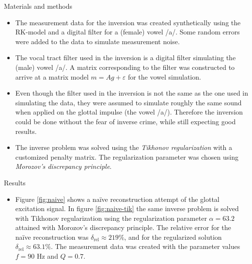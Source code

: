\documentclass[final]{beamer}
\newcommand{\eps}{\ensuremath{\varepsilon}}
\begin{document}
\begin{frame}[t]
\begin{columns}[t]
\begin{column}{.465\textwidth}
\begin{block}{Materials and methods}
\begin{itemize}
\item The measurement data for the inversion was created synthetically using the RK-model and a digital filter for a (female) vowel /a/. Some random errors were added to the data to simulate measurement noise.

\item The vocal tract filter used in the inversion is a digital filter simulating the (male) vowel /a/. A matrix corresponding to the filter was constructed to arrive at a matrix model $m = A g + \eps$ for the vowel simulation.

\item Even though the filter used in the inversion is not the same as the one used in simulating the data, they were assumed to simulate roughly the same sound when applied on the glottal impulse (the vowel /a/). Therefore the inversion could be done without the fear of inverse crime, while still expecting good results.

\item The inverse problem was solved using the \emph{Tikhonov regularization} with a customized penalty matrix. The regularization parameter was chosen using \emph{Morozov's discrepancy principle}.

\end{itemize}

\end{block}




\begin{block}{Results}

\begin{itemize}

\item Figure \ref{fig:naive} shows a naïve reconstruction attempt of the glottal excitation signal. In figure \ref{fig:naive-tik} the same inverse problem is solved with Tikhonov regularization using the regularization parameter $\alpha = 63.2$ attained with Morozov's discrepancy principle. The relative error for the naïve reconstruction was $\delta_{\text{rel}} \approx 219 \%$, and for the regularized solution $\delta_{\text{rel}} \approx 63.1 \%$. The measurement data was created with the parameter values $f = 90 \text{ Hz}$ and $Q = 0.7$.


\end{itemize}
\end{block}
\end{column}
\end{columns}
\end{frame}
\end{document}
